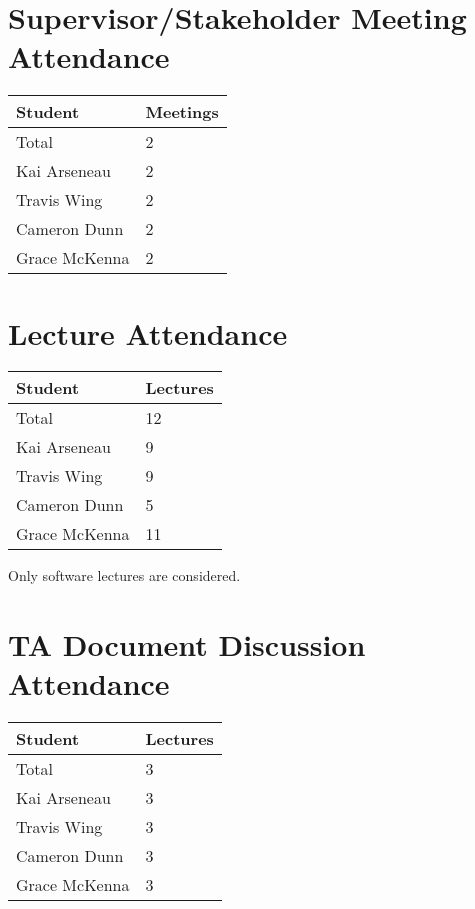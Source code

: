 \documentclass{article}
\begin{document}
\section{Supervisor/Stakeholder Meeting Attendance}



\begin{table}[H]
\centering
\begin{tabular}{ll}
\toprule
\textbf{Student} & \textbf{Meetings}\\
\midrule
Total & 2\\
Kai Arseneau & 2\\
Travis Wing & 2\\
Cameron Dunn & 2\\
Grace McKenna & 2\\
\bottomrule
\end{tabular}
\end{table}


\section{Lecture Attendance}


\begin{table}[H]
\centering
\begin{tabular}{ll}
\toprule
\textbf{Student} & \textbf{Lectures}\\
\midrule
Total & 12\\
Kai Arseneau & 9\\
Travis Wing & 9\\
Cameron Dunn & 5\\
Grace McKenna & 11\\
\bottomrule
\end{tabular}
\end{table}



Only software lectures are considered.

\section{TA Document Discussion Attendance}



\begin{table}[H]
\centering
\begin{tabular}{ll}
\toprule
\textbf{Student} & \textbf{Lectures}\\
\midrule
Total & 3\\
Kai Arseneau & 3\\
Travis Wing & 3\\
Cameron Dunn & 3\\
Grace McKenna & 3\\
\bottomrule
\end{tabular}
\end{table}
\end{document}
